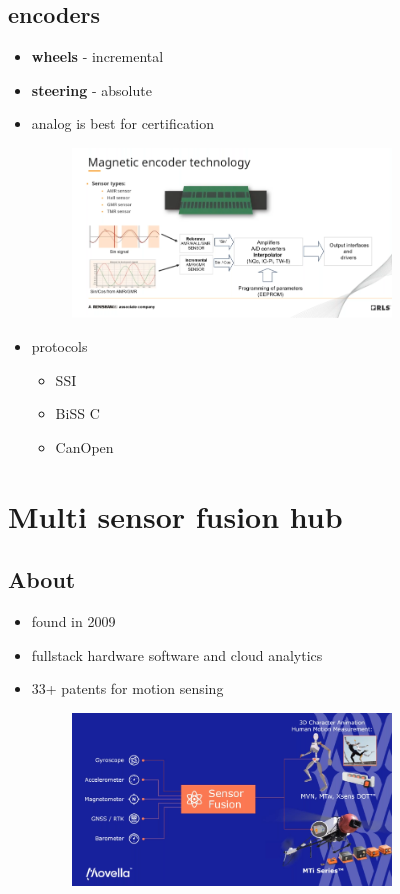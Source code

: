 \documentclass[a4paper]{article}
\begin{document}
\subsection{encoders}
\begin{itemize}
	\item \textbf{wheels} - incremental
	\item \textbf{steering} - absolute
	\item analog is best for certification
	      \begin{figure}[htpb]
		      \centering
		      \includegraphics[width=0.8\textwidth]{magneticEncoder.png}
		      \caption{}
		      \label{fig:}
	      \end{figure}
	\item protocols
	      \begin{itemize}
		      \item SSI
		      \item BiSS C
		      \item CanOpen
	      \end{itemize}
\end{itemize}
\newpage
\section{Multi sensor fusion hub}
\subsection{About}
\begin{itemize}
	\item found in 2009
	\item fullstack hardware software and cloud analytics
	\item 33+ patents for motion sensing
	      \begin{figure}[H]
		      \centering
		      \includegraphics[width=0.8\textwidth]{sensorFusionMovella.png}
		      \caption{}
		      \label{fig:}
	      \end{figure}
\end{itemize}
\end{document}
